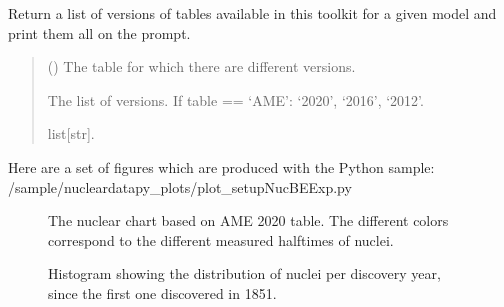 \documentclass[letterpaper,10pt,english]{sphinxmanual}
\begin{document}
\begin{fulllineitems}
\label{\detokenize{source/api/setup_nuc_be_exp:nucleardatapy.setup_nuc_be_exp.nuc_be_exp_versions}}
\pysigstartsignatures
\pysiglinewithargsret
{}
{}
{}
\pysigstopsignatures
\sphinxAtStartPar
Return a list of versions of tables available in
this toolkit for a given model and print them all on the prompt.
\begin{quote}\begin{description}
\sphinxAtStartPar
{} () \textendash{} The table for which there are different versions.

\sphinxAtStartPar
The list of versions.     If table == ‘AME’: ‘2020’, ‘2016’, ‘2012’.

\sphinxAtStartPar
list{[}str{]}.

\end{description}\end{quote}

\end{fulllineitems}


\sphinxAtStartPar
Here are a set of figures which are produced with the Python sample: /sample/nucleardatapy\_plots/plot\_setupNucBEExp.py

\begin{figure}[htbp]
\centering
\capstart

\noindent{}
\caption{The nuclear chart based on AME 2020 table. The different colors correspond to the different measured half\sphinxhyphen{}times of nuclei.}\label{\detokenize{source/api/setup_nuc_be_exp:id1}}\end{figure}

\begin{figure}[htbp]
\centering
\capstart

\noindent{}
\caption{Histogram showing the distribution of nuclei per discovery year, since the first one discovered in 1851.}\label{\detokenize{source/api/setup_nuc_be_exp:id2}}\end{figure}

\sphinxstepscope
\end{document}
